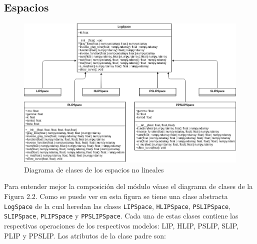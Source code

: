 \subsection{Espacios}

\begin{figure}
	\begin{center}
		\includegraphics[width=16.0 cm]{images/spaces_class_diagram.png}
		\caption{Diagrama de clases de los espacios no lineales}
	\end{center}
\end{figure}

Para entender mejor la composici\'on del m\'odulo v\'ease el diagrama de clases de la Figura 2.2. Como se puede ver en esta figura se tiene una clase abstracta \verb|LogSpace| de la cual heredan las clases \verb|LIPSpace|, \verb|HLIPSpace|, \verb|PSLIPSpace|, \verb|SLIPSpace|, \verb|PLIPSpace| y \verb|PPSLIPSpace|. Cada una de estas clases contiene las respectivas operaciones de los respectivos modelos: LIP, HLIP, PSLIP, SLIP, PLIP y PPSLIP. Los atributos de la clase padre son:

